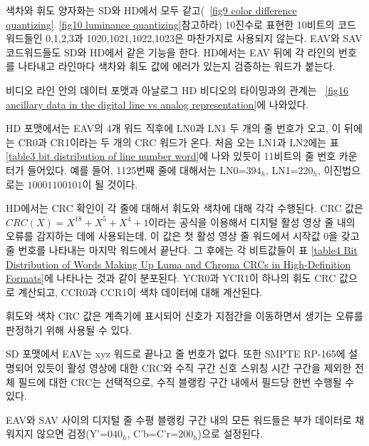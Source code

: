 색차와 휘도 양자화는 SD와 HD에서 모두 같고(\figurename~\ref{fig9 color difference quantizing}\와 \figurename~\ref{fig10 luminance quantizing}\을 참고하라) 10진수로 표현한 10비트의 코드워드들인 0,1,2,3과 1020,1021,1022,1023은 마찬가지로 사용되지 않는다.
EAV와 SAV 코드워드들도 SD와 HD에서 같은 기능을 한다. HD에서는 EAV 뒤에 각 라인의 번호를 나타내고 라인마다 색차와 휘도 값에 에러가 있는지 검증하는 워드가 붙는다.

비디오 라인 안의 데이터 포맷과 아날로그 HD 비디오의 타이밍과의 관계는 \figurename~\ref{fig16 ancillary data in the digital line vs analog representation}에 나와있다.

HD 포맷에서는 EAV의 4개 워드 직후에 LN0과 LN1 두 개의 줄 번호가 오고, 이 뒤에는 CR0과 CR1이라는 두 개의 CRC 워드가 온다. 처음 오는 LN1과 LN2에는 표 \ref{table3 bit distribution of line number word}에 나와 있듯이 11비트의 줄 번호 카운터가 들어있다.
예를 들어, 1125번째 줄에 대해서는 LN0=$394_h$, LN1=$220_h$, 이진법으로는 $10001100101$이 될 것이다.

HD에서는 CRC 확인이 각 줄에 대해서 휘도와 색차에 대해 각각 수행된다. CRC 값은 $CRC(X)=X^{18}+X^5+X^4+1$이라는 공식을 이용해서 디지털 활성 영상 줄 내의 오류를 감지하는 데에 사용되는데, 이 값은 첫 활성 영상 줄 워드에서 시작값 0을 갖고 줄 번호를 나타내는 마지막 워드에서 끝난다.
그 후에는 각 비트값들이 표 \ref{table4 Bit Distribution of Words Making Up Luma and Chroma CRCs in High-Definition Formats}에 나타나는 것과 같이 분포된다. YCR0과 YCR1이 하나의 휘도 CRC 값으로 계산되고, CCR0과 CCR1이 색차 데이터에 대해 계산된다.

휘도와 색차 CRC 값은 계측기에 표시되어 신호가 지점간을 이동하면서 생기는 오류를 판정하기 위해 사용될 수 있다.

SD 포맷에서 EAV는 xyz 워드로 끝나고 줄 번호가 없다. 또한 SMPTE RP-165에 설명되어 있듯이 활성 영상에 대한 CRC와 수직 구간 신호 스위칭 시간 구간을 제외한 전체 필드에 대한 CRC는 선택적으로, 수직 블랭킹 구간 내에서 필드당 한번 수행될 수 있다.

EAV와 SAV 사이의 디지털 줄 수평 블랭킹 구간 내의 모든 워드들은 부가 데이터로 채워지지 않으면 검정(Y'=$040_h$, C'b=C'r=$200_h$)으로 설정된다.


